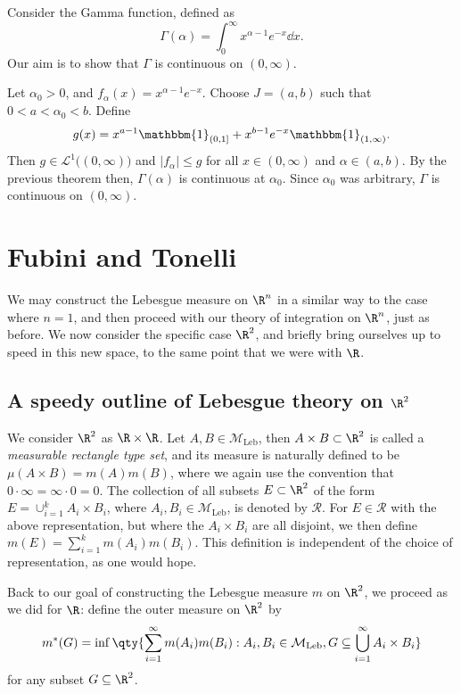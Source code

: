 \documentclass{maths}
\newcommand{\mleb}{\mathcal{M}_{\text{Leb}}}
\newcommand{\ind}{\mathbbm{1}}
\begin{document}
\begin{ex}
    Consider the Gamma function, defined as
    \[
        \Gamma(\alpha) =
        \int_0^{\infty} x^{\alpha-1} e^{-x} \dd{x}.
    \]
    Our aim is to show that $\Gamma$ is continuous on $(0,\infty)$.

    Let $\alpha_0>0$, and $f_\alpha(x)=x^{\alpha-1}e^{-x}$.
    Choose $J=(a,b)$ such that $0<a<\alpha_0<b$.
    Define
    \[
        g(x) =
        x^{a-1}\ind_{(0,1]} + x^{b-1}e^{-x}\ind_{(1,\infty)}.
    \]
    Then $g\in \mathcal{L}^1\big((0,\infty)\big)$ and $|f_\alpha|\leqslant g$ for all $x\in(0,\infty)$ and $\alpha\in(a,b)$.
    By the previous theorem then, $\Gamma(\alpha)$ is continuous at $\alpha_0$.
    Since $\alpha_0$ was arbitrary, $\Gamma$ is continuous on $(0,\infty)$.
\end{ex}

\section{Fubini and Tonelli}

We may construct the Lebesgue measure on $\R^n$ in a similar way to the case where $n=1$, and then proceed with our theory of integration on $\R^n$, just as before.
We now consider the specific case $\R^2$, and briefly bring ourselves up to speed in this new space, to the same point that we were with $\R$.

\subsection{A speedy outline of Lebesgue theory on \texorpdfstring{$\R^2$}{R2}}

We consider $\R^2$ as $\R\times\R$.
Let $A,B\in\mleb$, then $A\times B\subset\R^2$ is called a \emph{measurable rectangle type set}, and its measure is naturally defined to be $\mu(A\times B)=m(A)m(B)$, where we again use the convention that $0\cdot\infty=\infty\cdot0=0$.
The collection of all subsets $E\subset\R^2$ of the form $E=\cup_{i=1}^k A_i\times B_i$, where $A_i,B_i\in\mleb$, is denoted by $\mathcal{R}$.
For $E\in\mathcal{R}$ with the above representation, but where the $A_i\times B_i$ are all disjoint, we then define $m(E)=\sum_{i=1}^k m(A_i)m(B_i)$.
This definition is independent of the choice of representation, as one would hope.

Back to our goal of constructing the Lebesgue measure $m$ on $\R^2$, we proceed as we did for $\R$: define the outer measure on $\R^2$ by
\[
    m^*(G) =
    \inf\qty{\sum_{i=1}^{\infty} m(A_i)m(B_i) : A_i,B_i\in\mleb, G\subseteq\bigcup_{i=1}^{\infty} A_i\times B_i}
\]
for any subset $G\subseteq\R^2$.
\end{document}
